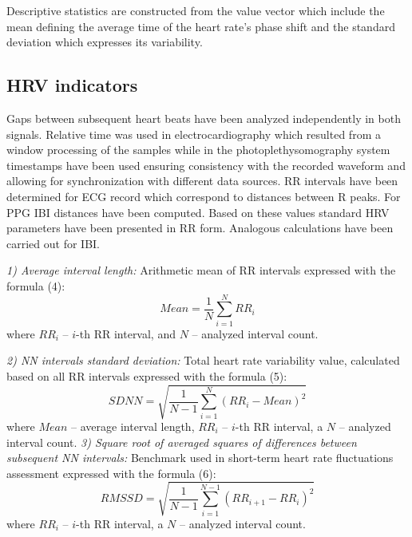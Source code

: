 \documentclass[journal]{IEEEtran}
\begin{document}
Descriptive statistics are constructed from the value vector which include the mean defining the average time of the heart rate's phase shift and the standard deviation which expresses its variability.

\subsection{HRV indicators}
Gaps between subsequent heart beats have been analyzed independently in both signals. Relative time was used in electrocardiography which resulted from a window processing of the samples while in the photoplethysomography system timestamps have been used ensuring consistency with the recorded waveform and allowing for synchronization with different data sources. RR intervals have been determined for ECG record which correspond to distances between R peaks. For PPG IBI distances have been computed. Based on these values standard HRV parameters have been presented in RR form. Analogous calculations have been carried out for IBI.

\noindent\textit{1) Average interval length:} 
Arithmetic mean of RR intervals expressed with the formula (4):
\begin{equation}
    Mean = \frac{1}{N} \sum_{i=1}^{N} RR_i
\end{equation}
where $RR_i$ -- $i$-th RR interval, and $N$ – analyzed interval count.

\noindent\textit{2) NN intervals standard deviation:} 
Total heart rate variability value, calculated based on all RR intervals expressed with the formula (5):%
\begin{equation}
    SDNN = \sqrt{\frac{1}{N-1} \sum_{i=1}^{N} (RR_i - Mean)^2}
\end{equation}
where $Mean$ – average interval length, $RR_i$ – $i$-th RR interval, a $N$ – analyzed interval count. 
\newpage
\noindent\textit{3) Square root of averaged squares of differences between subsequent NN intervals:} 
Benchmark used in short-term heart rate fluctuations assessment expressed with the formula (6):
\begin{equation}
    RMSSD = \sqrt{\frac{1}{N-1} \sum_{i=1}^{N-1} (RR_{i+1} - RR_i)^2}
\end{equation}
where $RR_i$ -- $i$-th RR interval, a $N$ – analyzed interval count.
\end{document}
